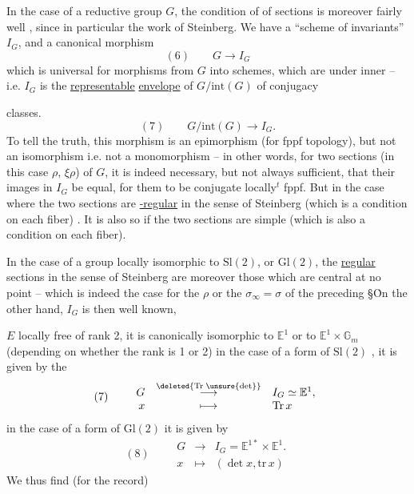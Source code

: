 In the case of a reductive group $G$, the condition of   of sections is moreover fairly well , since in particular the work of Steinberg. We have a ``scheme of invariants'' $I_G$, and a canonical morphism
\[
(6)\qquad G\longrightarrow I_G
\]
\unsure{(}which is universal  for morphisms from $G$ into schemes, which are  under inner  -- i.e. $I_G$ is the \uline{representable} \uline{envelope} of $G/\mathrm{int}(G)$  of conjugacy

classes.
\[
(7)\qquad G/\mathrm{int}(G)\longrightarrow I_G.
\]
To tell the truth,  this morphism is an epimorphism (for  fppf topology), but not an isomorphism i.e. not a monomorphism -- in other words, for two sections (in this case $\rho$, $\xi\rho$) of $G$, it is indeed necessary, but not always sufficient, that their images in $I_G$ be equal, for them to be conjugate locally$^{t}$ fppf. But in the case where the two sections are \uline{-regular} in the sense of Steinberg (which is a condition on each fiber)  . It is also so if the two sections are  simple (which is also a condition on each fiber).

In the case of a group locally isomorphic to $\mathrm{Sl}(2)$,  or $\mathrm{Gl}(2)$, the \uline{regular} sections in the sense of Steinberg are moreover those which are central at no point -- which is indeed the case for the $\rho$ or the $\sigma_\infty=\sigma$ of the preceding \S\. On the other hand, $I_G$ is then well known, 

$E$ locally free of rank 2, it is canonically isomorphic to $\mathbb E^1$ or to $\mathbb E^1\times\mathbb G_m$ (depending on whether the rank is 1 or 2) in the case of a form of $\mathrm{Sl}(2)$ , it is given by the \uline{}
\[
(7)\qquad
\begin{array}{rcl}
G&\overset{\deleted{\mathrm{Tr}\;\unsure{\det}}}{\longrightarrow}&I_G\simeq\mathbb E^1,\\
x&\longmapsto&\mathrm{Tr}\,x
\end{array}
\]
in the case of a form of $\mathrm{Gl}(2)$ it is given by
\[
(8)\qquad
\begin{array}{rcl}
G&\longrightarrow&I_G=\mathbb E^{1*}\times\mathbb E^1.\\
x&\longmapsto&(\det x,\mathrm{tr}\,x)
\end{array}
\]
We thus find (for the record)

